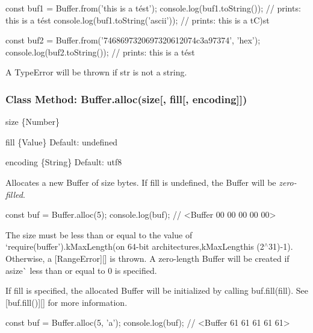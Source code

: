\begin{DoxyCode}
const buf1 = Buffer.from('this is a tést');
console.log(buf1.toString());
  // prints: this is a tést
console.log(buf1.toString('ascii'));
  // prints: this is a tC)st

const buf2 = Buffer.from('7468697320697320612074c3a97374', 'hex');
console.log(buf2.toString());
  // prints: this is a tést
\end{DoxyCode}


A {\ttfamily Type\+Error} will be thrown if {\ttfamily str} is not a string.

\subsubsection*{Class Method\+: Buffer.\+alloc(size\mbox{[}, fill\mbox{[}, encoding\mbox{]}\mbox{]})}


\begin{DoxyItemize}
\item {\ttfamily size} \{Number\}
\item {\ttfamily fill} \{Value\} Default\+: {\ttfamily undefined}
\item {\ttfamily encoding} \{String\} Default\+: {\ttfamily utf8}
\end{DoxyItemize}

Allocates a new {\ttfamily Buffer} of {\ttfamily size} bytes. If {\ttfamily fill} is {\ttfamily undefined}, the {\ttfamily Buffer} will be {\itshape zero-\/filled}.


\begin{DoxyCode}
const buf = Buffer.alloc(5);
console.log(buf);
  // <Buffer 00 00 00 00 00>
\end{DoxyCode}


The {\ttfamily size} must be less than or equal to the value of `require(\textquotesingle{}buffer').k\+Max\+Length{\ttfamily (on 64-\/bit architectures,}k\+Max\+Length{\ttfamily is }(2$^\wedge$31)-\/1{\ttfamily ). Otherwise, a \mbox{[}}Range\+Error{\ttfamily \mbox{]}\mbox{[}\mbox{]} is thrown. A zero-\/length Buffer will be created if a}size\`{} less than or equal to 0 is specified.

If {\ttfamily fill} is specified, the allocated {\ttfamily Buffer} will be initialized by calling {\ttfamily buf.\+fill(fill)}. See \mbox{[}{\ttfamily buf.\+fill()}\mbox{]}\mbox{[}\mbox{]} for more information.


\begin{DoxyCode}
const buf = Buffer.alloc(5, 'a');
console.log(buf);
  // <Buffer 61 61 61 61 61>
\end{DoxyCode}


